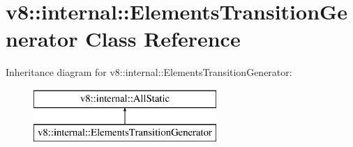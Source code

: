 \hypertarget{classv8_1_1internal_1_1_elements_transition_generator}{}\section{v8\+:\+:internal\+:\+:Elements\+Transition\+Generator Class Reference}
\label{classv8_1_1internal_1_1_elements_transition_generator}
Inheritance diagram for v8\+:\+:internal\+:\+:Elements\+Transition\+Generator\+:\begin{figure}[H]
\begin{center}
\leavevmode
\includegraphics[height=2.000000cm]{classv8_1_1internal_1_1_elements_transition_generator}
\end{center}
\end{figure}
